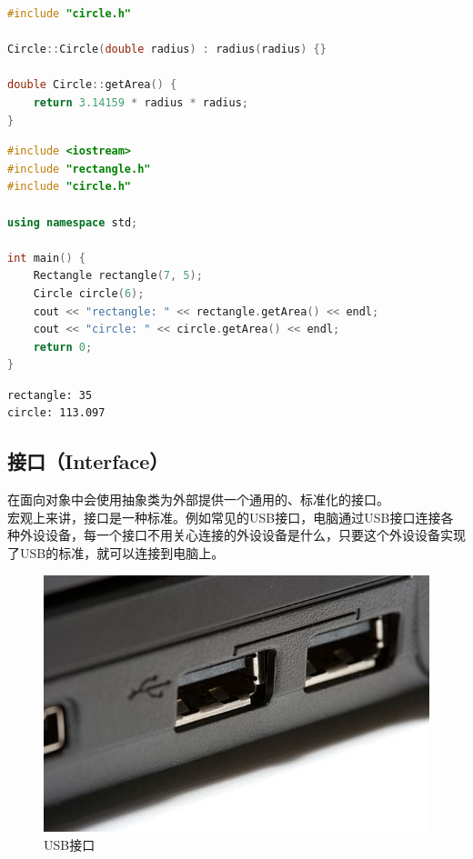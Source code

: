 \begin{lstlisting}[language=C++, title=circle.cpp]
#include "circle.h"

Circle::Circle(double radius) : radius(radius) {}

double Circle::getArea() {
	return 3.14159 * radius * radius;
}
\end{lstlisting}

\begin{lstlisting}[language=C++, title=test\_shape.cpp]
#include <iostream>
#include "rectangle.h"
#include "circle.h"

using namespace std;

int main() {
	Rectangle rectangle(7, 5);
	Circle circle(6);
	cout << "rectangle: " << rectangle.getArea() << endl;
	cout << "circle: " << circle.getArea() << endl;
	return 0;
}
\end{lstlisting}

\begin{tcolorbox}
	\begin{verbatim}
rectangle: 35
circle: 113.097
	\end{verbatim}
\end{tcolorbox}

\subsection{接口（Interface）}

在面向对象中会使用抽象类为外部提供一个通用的、标准化的接口。 \\

宏观上来讲，接口是一种标准。例如常见的USB接口，电脑通过USB接口连接各种外设设备，每一个接口不用关心连接的外设设备是什么，只要这个外设设备实现了USB的标准，就可以连接到电脑上。

\begin{figure}[H]
	\centering
	\includegraphics[scale=0.4]{img/C4/4-3/1.png}
	\caption{USB接口}
\end{figure}

